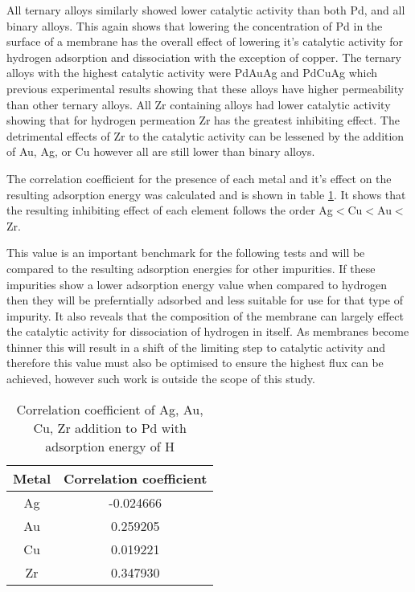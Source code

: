 All ternary alloys similarly showed lower catalytic activity than both Pd, and all binary alloys. This again shows that lowering the concentration of Pd in the surface of a membrane has the overall effect of lowering it's catalytic activity for hydrogen adsorption and dissociation with the exception of copper. The ternary alloys with the highest catalytic activity were PdAuAg and PdCuAg which previous experimental results showing that these alloys have higher permeability than other ternary alloys. All Zr containing alloys had lower catalytic activity showing that for hydrogen permeation Zr has the greatest inhibiting effect. The detrimental effects of Zr to the catalytic activity can be lessened by the addition of Au, Ag, or Cu however all are still lower than binary alloys. 

The correlation coefficient for the presence of each metal and it's effect on the resulting adsorption energy was calculated and is shown in table \ref{corrH}. It shows that the resulting inhibiting effect of each element follows the order Ag$<$Cu$<$Au$<$Zr. 

This value is an important benchmark for the following tests and will be compared to the resulting adsorption energies for other impurities. If these impurities show a lower adsorption energy value when compared to hydrogen then they will be preferntially adsorbed and less suitable for use for that type of impurity. It also reveals that the composition of the membrane can largely effect the catalytic activity for dissociation of hydrogen in itself. As membranes become thinner this will result in a shift of the limiting step to catalytic activity and therefore this value must also be optimised to ensure the highest flux can be achieved, however such work is outside the scope of this study. 

\begin{table}[]
  \centering
  \caption{Correlation coefficient of Ag, Au, Cu, Zr addition to Pd with adsorption energy of H}
  \label{corrH}
  \begin{tabular}{@{}cc@{}}
  \toprule
  Metal & Correlation coefficient \\ \midrule
  Ag    & -0.024666               \\
  Au    & 0.259205                \\
  Cu    & 0.019221                \\
  Zr    & 0.347930                \\ \bottomrule
  \end{tabular}
  \end{table}

